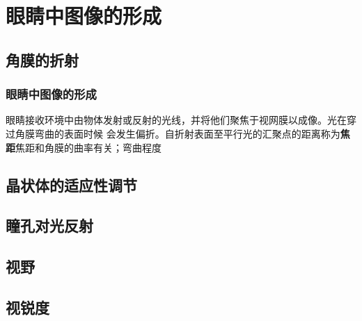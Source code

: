 \section{眼睛中图像的形成}
\subsection{角膜的折射}
\begin{frame}
    \frametitle{眼睛中图像的形成}

    眼睛接收环境中由物体发射或反射的光线，并将他们聚焦于视网膜以成像。光在穿过角膜弯曲的表面时候
    会发生偏折。自折射表面至平行光的汇聚点的距离称为\textbf{焦距}焦距和角膜的曲率有关；弯曲程度

\end{frame}
\subsection{晶状体的适应性调节}
\subsection{瞳孔对光反射}
\subsection{视野}
\subsection{视锐度}
